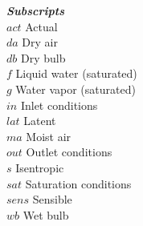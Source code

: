 \documentclass[]{article}
\begin{document}
\begin{tabbing}
  \textbf{\textit{Subscripts}}\\
  $act$ \> Actual \\
  $da$ \> Dry air \\
  $db$ \> Dry bulb \\
    $f$ \> Liquid water (saturated) \\
    $g$ \> Water vapor (saturated) \\
  $in$ \> Inlet conditions \\
  $lat$ \> Latent \\
  $ma$ \> Moist air \\
  $out$ \> Outlet conditions \\
  $s$ \> Isentropic \\
  $sat$ \> Saturation conditions \\
  $sens$ \> Sensible \\
  $wb$ \> Wet bulb %

 \end{tabbing}
\end{document}
